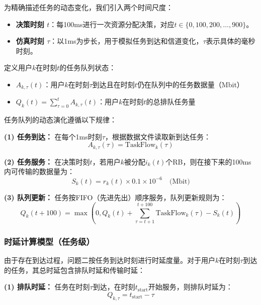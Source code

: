 为精确描述任务的动态变化，我们引入两个时间尺度：
\begin{itemize}
    \item \textbf{决策时刻 $t$}：每100ms进行一次资源分配决策，对应$t \in \{0, 100, 200, \ldots, 900\}$。
    \item \textbf{仿真时刻 $\tau$}：以1ms为步长，用于模拟任务到达和信道变化，$\tau$表示具体的毫秒时刻。
\end{itemize}

定义用户$k$在时刻$t$的任务队列状态：

\begin{itemize}
  \item $A_{k,\tau}(t)$：用户$k$在时刻$\tau$到达且在时刻$t$仍在队列中的任务数据量（Mbit）
  \item $Q_k(t) = \sum_{\tau=0}^{t} A_{k,\tau}(t)$：用户$k$在时刻$t$的总排队任务量
\end{itemize}

任务队列的动态演化遵循以下规律：

\textbf{(1) 任务到达：}
在每个1ms时刻$\tau$，根据数据文件读取新到达任务：
\begin{equation}
A_{k,\tau}(\tau) = \text{TaskFlow}_k(\tau)
\end{equation}

\textbf{(2) 任务服务：}
在决策时刻$t$，若用户$k$被分配$i_k(t)$个RB，则在接下来的100ms内可传输的数据量为：
\begin{equation}
S_k(t) = r_k(t) \times 0.1 \times 10^{-6} \quad \text{(Mbit)}
\end{equation}

\textbf{(3) 队列更新：}
任务按FIFO（先进先出）顺序服务，队列更新规则为：
\begin{equation}
\label{eq:queue_evolution}
Q_k(t+100) = \max\left(0, Q_k(t) + \sum_{\tau=t+1}^{t+100} \text{TaskFlow}_k(\tau) - S_k(t)\right)
\end{equation}

\subsubsection{时延计算模型（任务级）}
 
由于存在到达过程，问题二按任务到达时刻进行时延度量。对于用户$k$在时刻$\tau$到达的任务，其总时延包含排队时延和传输时延：

\textbf{(1) 排队时延：}
任务在时刻$\tau$到达，在时刻$t_{\text{start}}$开始服务，则排队时延为：
\begin{equation}
Q_{k,\tau} = t_{\text{start}} - \tau
\end{equation}

